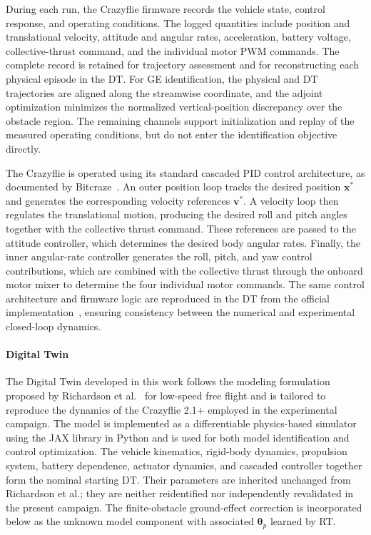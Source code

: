 \documentclass[journal]{IEEEtran}
\begin{document}
During each run, the Crazyflie firmware records the vehicle state, control response, and operating conditions. The logged quantities include position and translational velocity, attitude and angular rates, acceleration, battery voltage, collective-thrust command, and the individual motor PWM commands. The complete record is retained for trajectory assessment and for reconstructing each physical episode in the DT. For GE identification, the physical and DT trajectories are aligned along the streamwise coordinate, and the adjoint optimization minimizes the normalized vertical-position discrepancy over the obstacle region. The remaining channels support initialization and replay of the measured operating conditions, but do not enter the identification objective directly.

The Crazyflie is operated using its standard cascaded PID control architecture, as documented by Bitcraze~\cite{BitcrazeControllers}. An outer position loop tracks the desired position $\mathbf{x}^{*}$ and generates the corresponding velocity references $\mathbf{v}^{*}$. A velocity loop then regulates the translational motion, producing the desired roll and pitch angles together with the collective thrust command. These references are passed to the attitude controller, which determines the desired body angular rates. Finally, the inner angular-rate controller generates the roll, pitch, and yaw control contributions, which are combined with the collective thrust through the onboard motor mixer to determine the four individual motor commands. The same control architecture and firmware logic are reproduced in the DT from the official implementation~\cite{BitcrazeFirmware}, ensuring consistency between the numerical and experimental closed-loop dynamics.

\paragraph*{Digital Twin}
\label{sec:digital_twin}

The Digital Twin developed in this work follows the modeling formulation proposed by Richardson et al.~\cite{Richardson2025} for low-speed free flight and is tailored to reproduce the dynamics of the Crazyflie 2.1+ employed in the experimental campaign. The model is implemented as a differentiable physics-based simulator using the JAX library in Python and is used for both model identification and control optimization. The vehicle kinematics, rigid-body dynamics, propulsion system, battery dependence, actuator dynamics, and cascaded controller together form the nominal starting DT. Their parameters are inherited unchanged from Richardson et al.; they are neither reidentified nor independently revalidated in the present campaign. The finite-obstacle ground-effect correction is incorporated below as the unknown model component with associated $\boldsymbol{\theta}_p$ learned by RT.
\end{document}
